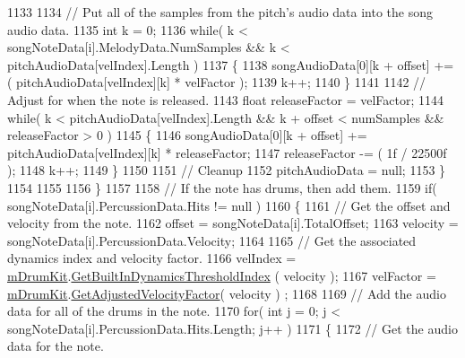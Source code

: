 \begin{DoxyCode}
1133 
1134                     \textcolor{comment}{// Put all of the samples from the pitch's audio data into the song audio data.}
1135                     \textcolor{keywordtype}{int} k = 0;
1136                     \textcolor{keywordflow}{while}( k < songNoteData[i].MelodyData.NumSamples && k < pitchAudioData[velIndex].Length
       )
1137                     \{
1138                         songAudioData[0][k + offset] += ( pitchAudioData[velIndex][k] * velFactor );
1139                         k++;
1140                     \}
1141 
1142                     \textcolor{comment}{// Adjust for when the note is released.}
1143                     \textcolor{keywordtype}{float} releaseFactor = velFactor;
1144                     \textcolor{keywordflow}{while}( k < pitchAudioData[velIndex].Length && k + offset < numSamples && releaseFactor
       > 0 )
1145                     \{
1146                         songAudioData[0][k + offset] += pitchAudioData[velIndex][k] * releaseFactor;
1147                         releaseFactor -= ( 1f / 22500f );
1148                         k++;
1149                     \}
1150 
1151                     \textcolor{comment}{// Cleanup}
1152                     pitchAudioData = null;
1153                 \}
1154 
1155 
1156             \}
1157 
1158             \textcolor{comment}{// If the note has drums, then add them.}
1159             \textcolor{keywordflow}{if}( songNoteData[i].PercussionData.Hits != null )
1160             \{
1161                 \textcolor{comment}{// Get the offset and velocity from the note.}
1162                 offset = songNoteData[i].TotalOffset;
1163                 velocity = songNoteData[i].PercussionData.Velocity;
1164 
1165                 \textcolor{comment}{// Get the associated dynamics index and velocity factor.}
1166                 velIndex = \hyperlink{group___v_i_m_priv_ga0bc7c9f776b0d2dae0ccb1f1ee5f2143}{mDrumKit}.\hyperlink{group___v_i_base_pub_func_gacddf07c08c3a8154a6934be22f539788}{GetBuiltInDynamicsThresholdIndex}
      ( velocity );
1167                 velFactor = \hyperlink{group___v_i_m_priv_ga0bc7c9f776b0d2dae0ccb1f1ee5f2143}{mDrumKit}.\hyperlink{group___v_i_base_pub_func_gae638c68bd0e79d0b99495be69e50f49d}{GetAdjustedVelocityFactor}( velocity )
      ;
1168 
1169                 \textcolor{comment}{// Add the audio data for all of the drums in the note.}
1170                 \textcolor{keywordflow}{for}( \textcolor{keywordtype}{int} j = 0; j < songNoteData[i].PercussionData.Hits.Length; j++ )
1171                 \{
1172                     \textcolor{comment}{// Get the audio data for the note.}

\end{DoxyCode}
